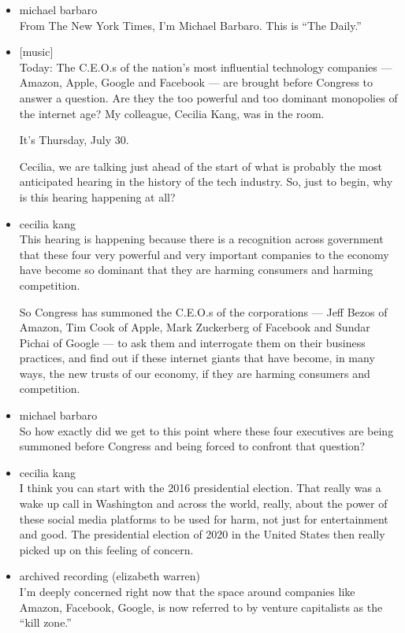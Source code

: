 \begin{itemize}
\item
  michael barbaro\\
  From The New York Times, I'm Michael Barbaro. This is ``The Daily.''
\item
  {[}music{]}\\
  Today: The C.E.O.s of the nation's most influential technology
  companies --- Amazon, Apple, Google and Facebook --- are brought
  before Congress to answer a question. Are they the too powerful and
  too dominant monopolies of the internet age? My colleague, Cecilia
  Kang, was in the room.

  It's Thursday, July 30.

  Cecilia, we are talking just ahead of the start of what is probably
  the most anticipated hearing in the history of the tech industry. So,
  just to begin, why is this hearing happening at all?
\item
  cecilia kang\\
  This hearing is happening because there is a recognition across
  government that these four very powerful and very important companies
  to the economy have become so dominant that they are harming consumers
  and harming competition.

  So Congress has summoned the C.E.O.s of the corporations --- Jeff
  Bezos of Amazon, Tim Cook of Apple, Mark Zuckerberg of Facebook and
  Sundar Pichai of Google --- to ask them and interrogate them on their
  business practices, and find out if these internet giants that have
  become, in many ways, the new trusts of our economy, if they are
  harming consumers and competition.
\item
  michael barbaro\\
  So how exactly did we get to this point where these four executives
  are being summoned before Congress and being forced to confront that
  question?
\item
  cecilia kang\\
  I think you can start with the 2016 presidential election. That really
  was a wake up call in Washington and across the world, really, about
  the power of these social media platforms to be used for harm, not
  just for entertainment and good. The presidential election of 2020 in
  the United States then really picked up on this feeling of concern.
\item
  archived recording (elizabeth warren)\\
  I'm deeply concerned right now that the space around companies like
  Amazon, Facebook, Google, is now referred to by venture capitalists as
  the ``kill zone.''
\end{itemize}

